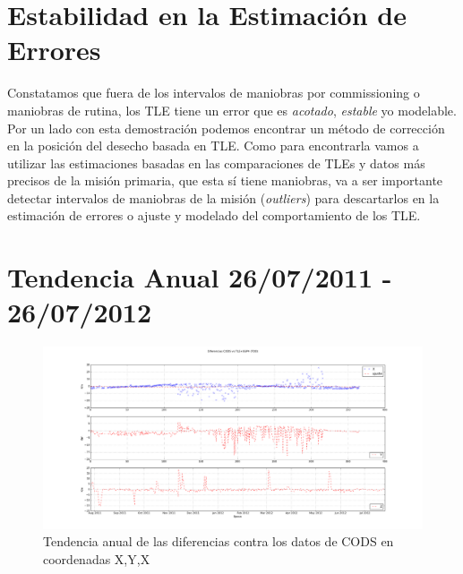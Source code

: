 \section{Estabilidad en la Estimaci\'on de Errores}
Constatamos que fuera de los intervalos de maniobras por commissioning o maniobras de rutina, los TLE tiene un error que es {\it{acotado}}, {\it{estable}} y\/o modelable. Por un lado con esta demostraci\'on podemos encontrar un m\'etodo de correcci\'on en la posici\'on del desecho basada en TLE. Como para encontrarla vamos a utilizar las estimaciones basadas en las comparaciones de TLEs y datos m\'as precisos de la misi\'on primaria, que esta s\'i tiene maniobras, va a ser importante detectar intervalos de maniobras de la misión ({\it{outliers}}) para descartarlos en la estimaci\'on de errores o ajuste y modelado del comportamiento de los TLE.\\


\section*{Tendencia Anual 26/07/2011 - 26/07/2012}
\begin{figure}[!h]
\centering
  \includegraphics[width=\textwidth]{imagenes/SACD2012tod}
  \caption{Tendencia anual de las diferencias contra los datos de CODS en coordenadas X,Y,X}
\end{figure}

